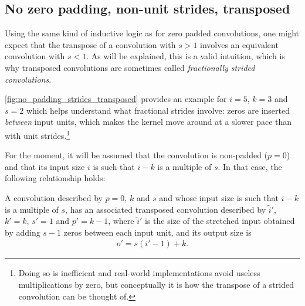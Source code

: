 \subsection{No zero padding, non-unit strides, transposed}

Using the same kind of inductive logic as for zero padded convolutions, one
might expect that the transpose of a convolution with $s > 1$ involves an
equivalent convolution with $s < 1$. As will be explained, this is a valid
intuition, which is why transposed convolutions are sometimes called {\em
fractionally strided convolutions}.

\autoref{fig:no_padding_strides_transposed} provides an example for $i = 5$, $k
= 3$ and $s = 2$ which helps understand what fractional strides involve: zeros
are inserted {\em between\/} input units, which makes the kernel move around at
a slower pace than with unit strides.\footnote{Doing so is inefficient and
    real-world implementations avoid useless multiplications by zero, but
    conceptually it is how the transpose of a strided convolution can be
    thought of.}

For the moment, it will be assumed that the convolution is non-padded ($p = 0$)
and that its input size $i$ is such that $i - k$ is a multiple of $s$. In that
case, the following relationship holds:

\begin{relationship}\label{rel:no_padding_strides_transposed}
A convolution described by $p = 0$, $k$ and $s$ and whose input
size is such that $i - k$ is a multiple of $s$, has an associated transposed
convolution described by $\tilde{i}'$, $k' = k$, $s' = 1$ and $p' = k - 1$,
where $\tilde{i}'$ is the size of the stretched input obtained by adding
$s - 1$ zeros between each input unit, and its output size is
\begin{equation*}
\begin{split}
    o' = s (i' - 1) + k.
\end{split}
\end{equation*}
\end{relationship}

